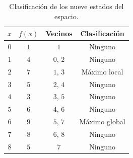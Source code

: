 \begin{table}[H]
\centering
\small
\setlength{\tabcolsep}{6pt}
\renewcommand{\arraystretch}{1.15}
\begin{tabular}{|c|c|c|c|}
\hline
\rowcolor{encabezado}\textbf{$x$} & \textbf{$f(x)$} & \textbf{Vecinos} & \textbf{Clasificación} \\
\hline
$0$ & $1$ & $1$ & Ninguno \\
\hline
$1$ & $4$ & $0$, $2$ & Ninguno \\
\hline
$2$ & $7$ & $1$, $3$ & Máximo local \\
\hline
$3$ & $5$ & $2$, $4$ & Ninguno \\
\hline
$4$ & $3$ & $3$, $5$ & Ninguno \\
\hline
$5$ & $6$ & $4$, $6$ & Ninguno \\
\hline
$6$ & $9$ & $5$, $7$ & Máximo global \\
\hline
$7$ & $8$ & $6$, $8$ & Ninguno \\
\hline
$8$ & $5$ & $7$ & Ninguno \\
\hline
\end{tabular}
\caption{Clasificación de los nueve estados del espacio.}
\label{tab:p2a-clasificacion}
\end{table}
